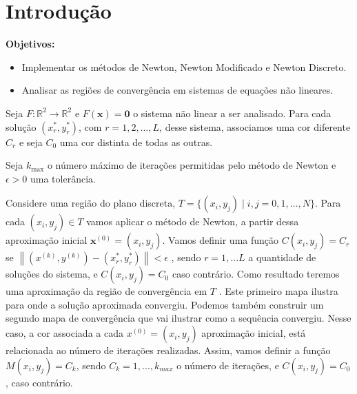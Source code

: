 \section{Introdução}
\textbf{Objetivos:}
\begin{itemize}
    \item Implementar os métodos de Newton, Newton Modificado e Newton Discreto.
    \item Analisar as regiões de convergência em sistemas de equações não lineares.
\end{itemize}
\vspace{5pt}
Seja
$F:\mathbb{R}^2 \to \mathbb{R}^2$ e $F(\mathbf{x}) = \mathbf{0}$ 
o sistema não linear a ser analisado.
Para cada solução 
$(x_r^*, y_r^*)$, com $r = 1, 2, \ldots, L$,
desse sistema, associamos uma cor diferente 
$C_r$ 
e seja 
$C_0$ 
uma cor distinta de todas as outras.

Seja 
$k_{\max}$ 
o número máximo de iterações permitidas pelo método de Newton e
$\epsilon > 0$ 
uma tolerância.

Considere uma região do plano discreta,
$T = \{(x_i, y_j) \mid i, j = 0, 1, \ldots, N\}$.
Para cada 
$(x_i, y_j) \in T$ 
vamos aplicar o método de Newton, a partir dessa aproximação inicial 
$\mathbf{x}^{(0)} = (x_i, y_j)$. 
Vamos definir uma função 
$C(x_i, y_j) = C_r$ se $\left\| (x^{(k)}, y^{(k)}) - (x_r^*, y_r^*) \right\| < \epsilon$
, sendo $r = 1, ... L$ a quantidade de soluções do sistema, e $C(x_i, y_j) = C_0$  caso contrário. Como resultado teremos uma aproximação da região de convergência em $T$ .
Este primeiro mapa ilustra para onde a solução aproximada convergiu.
Podemos também construir um segundo mapa de convergência que vai ilustrar como a sequência convergiu.
Nesse caso, a cor associada a cada $x^{(0)} = (x_i, y_j)$ aproximação inicial, está relacionada ao número de iterações
realizadas. Assim, vamos definir a função $M(x_i, y_j) = C_k$, sendo $C_k = 1, ..., k_{max}$ o número de iterações, e $C(x_i, y_j) = C_0$, caso contrário.
